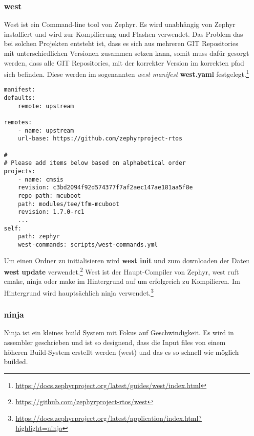     \subsubsection{west}
            West ist ein Command-line tool von Zephyr. Es wird unabhängig von Zephyr installiert und wird zur Kompilierung und Flashen verwendet. 
            Das Problem das bei solchen Projekten entsteht ist, dass es sich aus mehreren GIT Repositories mit unterschiedlichen Versionen zusammen setzen kann, somit
            muss dafür gesorgt werden, dass alle GIT Repositories, mit der korrekter Version im korrekten pfad sich befinden. 
            Diese werden im sogenannten \textit{west manifest} \textbf{west.yaml} festgelegt.\footnote{\url{https://docs.zephyrproject.org/latest/guides/west/index.html}}
            \begin{lstlisting}[style=StylePython, captionpos=b, caption=west.yaml]
manifest:
defaults:
    remote: upstream

remotes:
    - name: upstream
    url-base: https://github.com/zephyrproject-rtos

#
# Please add items below based on alphabetical order
projects:
    - name: cmsis
    revision: c3bd2094f92d574377f7af2aec147ae181aa5f8e
    repo-path: mcuboot
    path: modules/tee/tfm-mcuboot
    revision: 1.7.0-rc1
    ...
self:
    path: zephyr
    west-commands: scripts/west-commands.yml    
            \end{lstlisting} 
            Um einen Ordner zu initialisieren wird \textbf{west init} und zum downloaden der Daten \textbf{west update} verwendet.\footnote{\url{https://github.com/zephyrproject-rtos/west}}
            West ist der Haupt-Compiler von Zephyr, west ruft cmake, ninja oder make im Hintergrund auf um erfolgreich zu Kompilieren. 
            Im Hintergrund wird hauptsächlich ninja verwendet.\footnote{\url{https://docs.zephyrproject.org/latest/application/index.html?highlight=ninja}}


\newpage
    \subsubsection{ninja}
        Ninja ist ein kleines build System mit Fokus auf Geschwindigkeit. 
        Es wird in assembler geschrieben und ist so designend, dass die Input files von einem höheren Build-System erstellt werden (west) und das es so schnell wie möglich builded. 
        

